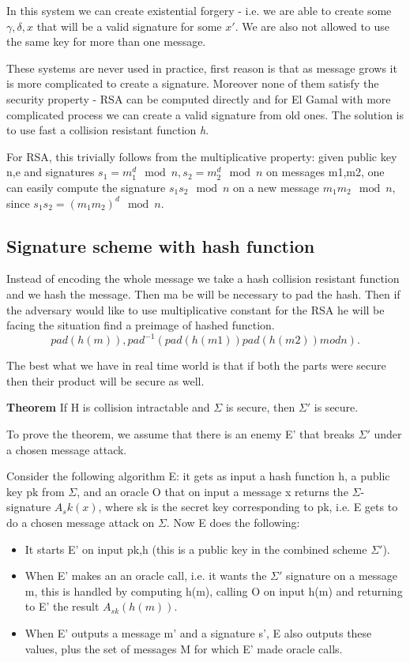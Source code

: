 \documentclass[a4paper,10pt]{article}
\begin{document}
In this system we can create existential forgery - i.e. we are able to create some $\gamma,\delta,x$ that will be a valid signature for some $x'$. We are also not allowed to use the same key for more than one message.

These systems are never used in practice, first reason is that as message grows it is more complicated to create a signature. Moreover none of them satisfy the security property - RSA can be computed directly and for El Gamal with more complicated process we can create a valid signature from old ones. The solution is to use fast a collision resistant function \textit{h}.

For RSA, this trivially follows from the multiplicative property: given public key n,e and signatures $s_1 = m^d_1
\mod n,s_2= m^d_2 \mod n$ on messages m1,m2, one can easily compute the signature $s_1s_2\mod n$ on a new message $m_1m_2\mod n$, since $s_1s_2= (m_1m_2)^d\mod n$.

\subsection*{Signature scheme with hash function}
Instead of encoding the whole message we take a hash collision resistant function and we hash the message. Then ma be will be necessary to pad the hash.
Then if the adversary would like to use multiplicative constant for the RSA he will be facing the situation find a preimage of hashed function.
$$
pad(h(m)), pad^{−1}(pad(h(m1))pad(h(m2)) mod n).
$$

The best what we have in real time world is that if both the parts were secure then their product will be secure as well.

\noindent
\textbf{Theorem} If H is collision intractable and $\Sigma$ is secure, then $\Sigma'$ is secure.

To prove the theorem, we assume that there is an enemy E' that breaks
$\Sigma'$ under a chosen message attack.

Consider the following algorithm E: it gets as input a hash function h,
a public key pk from $\Sigma$, and an oracle O that on input a message x returns
the $\Sigma$-signature $A_sk(x)$, where sk is the secret key corresponding to pk, i.e.
E gets to do a chosen message attack on $\Sigma$.
Now E does the following:
\begin{itemize}
\item It starts E' on input pk,h (this is a public key in the combined scheme
$\Sigma'$).
\item When E' makes an an oracle call, i.e. it wants the $\Sigma'$ signature on
a message m, this is handled by computing h(m), calling O on input
h(m) and returning to E' the result $A_{sk}(h(m))$.
\item When E' outputs a message m' and a signature s', E also outputs these
values, plus the set of messages M for which E' made oracle calls.
\end{itemize}
\end{document}
